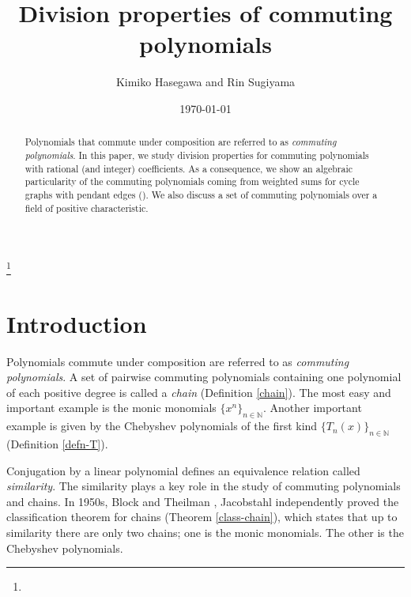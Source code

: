 \documentclass[a4paper, 11pt]{amsart}
\numberwithin{equation}{section}
\theoremstyle{definition}
\newcommand{\N}{\mathbb{N}}
\begin{document}
 

\title[Division properties of commuting polynomials]{Division properties of commuting polynomials} 
\author[K.~Hasegawa and R.~Sugiyama]{Kimiko Hasegawa and Rin Sugiyama}

\address[K.~Hasegawa]{Japan Women's university}
\address[R.~Sugiyama]{Japan Women's university}
\date{\today} 
\address{Department of Mathematics, Physics, and Computer science, Japan Women's University, 2-8-2 Mejirodai, Bunkyo-ku Tokyo, 112-8681 Japan}

\begin{abstract}
Polynomials that commute under composition are referred to  as \textit{commuting polynomials}.
In this paper, we study division properties for commuting polynomials with rational (and integer) coefficients.
As a consequence, we show an algebraic particularity of the commuting polynomials coming from weighted sums for cycle graphs with pendant edges (\cite{FHIK}).
We also discuss a set of commuting polynomials over a field of positive characteristic. 
\end{abstract}

\thanks{}
\maketitle



\section{Introduction}
Polynomials commute under composition are referred to as \textit{commuting polynomials}.
A set of pairwise commuting polynomials containing one polynomial of each
positive degree is called a \textit{chain} (Definition \ref{chain}). 
The most easy and important example is the monic monomials $\{x^n\}_{n\in \N}$.
Another important example is given by the Chebyshev polynomials of the first kind $\{T_n(x)\}_{n\in\N}$ (Definition \ref{defn-T}).

Conjugation by a linear polynomial defines an equivalence relation called \textit{similarity}.
The similarity plays a key role in the study of commuting polynomials and chains. 
In 1950s, Block and Theilman \cite{BT}, Jacobstahl \cite{J} independently proved the classification theorem for chains (Theorem \ref{class-chain}), which states that up to similarity there are only two chains; one is the monic monomials.
The other is the Chebyshev polynomials.
\end{document}
